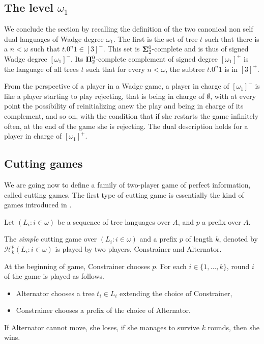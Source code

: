 \subsection{The level $\omega_1$}
We conclude the section by recalling the definition of the two canonical non self dual languages of Wadge degree $\omega_1$. The first is the set of tree $t$ such that there is a $n<\omega$ such that $t.0^n1 \in [3]^-$. This set is ${\bf \Sigma}^0_2$-complete and is thus of signed Wadge degree $[\omega_1]^-$. Its ${\bf \Pi}^0_2$-complete complement of signed degree $[\omega_1]^+$ is the language of all trees $t$ such that for every $n<\omega$, the subtree $t.0^n1$ is in  $[3]^+$.

From the perspective of a player in a Wadge game, a player in charge of $[\omega_1]^-$ is like a player starting to play rejecting, that is being in charge of $\emptyset$, with at every point the possibility of reinitializing anew the play and being in charge of its complement, and so on, with the condition that if she restarts the game infinitely often, at the end of the game she is rejecting. 
The dual description holds for a player in charge of $[\omega_1]^+$.



\subsection{Cutting games}

We are going now to define a family of two-player game of perfect information, called cutting games. 
The first type of cutting game is essentially the kind of games introduced in \cite{bp}.

Let $( L_i : i \in \omega )$ be a sequence of tree languages over $A$, and $p$ a prefix over $A$. 

The \emph{simple} cutting game over $( L_i : i \in \omega )$ and a prefix $p$ of length $k$, denoted by $\mathcal{H}^p_k(L_i : i \in \omega )$ is played by two players, Constrainer and Alternator.

At the beginning of game, Constrainer chooses $p$.
For each $i \in \{1, \dots, k \}$, round $i$ of the game is played as follows.
\begin{itemize}
\item Alternator chooses a tree $t_i \in L_i$ extending the choice of Constrainer, 
\item Constrainer chooses a prefix of the choice of Alternator.
\end{itemize}
If Alternator cannot move, she loses, if she manages to survive $k$ rounds, then she wins.

